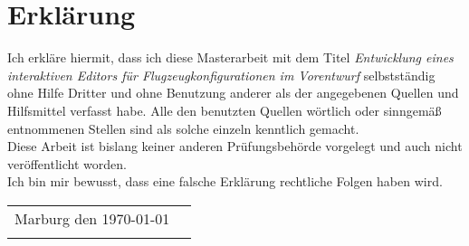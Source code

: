 \chapter*{Erkl\"arung}
\thispagestyle{empty}

\normalsize
Ich erkl\"are hiermit, dass ich diese Masterarbeit mit dem Titel \textit{Entwicklung eines interaktiven Editors f\"ur Flugzeugkonfigurationen im Vorentwurf} selbstst\"andig ohne Hilfe Dritter und ohne Benutzung anderer als der angegebenen Quellen und Hilfsmittel verfasst habe. Alle den benutzten Quellen w\"ortlich oder sinngem\"a\ss {} entnommenen Stellen sind als solche einzeln kenntlich gemacht.\\

\noindent Diese Arbeit ist bislang keiner anderen Pr\"ufungsbeh\"orde vorgelegt und auch nicht ver\"offentlicht worden.\\

\noindent Ich bin mir bewusst, dass eine falsche Erkl\"arung rechtliche Folgen haben wird.\\[3cm]

 
\vspace{5em}
 
\begin{flushright}
\begin{table}[ht]
\begin{tabularx}{\textwidth}{Xp{7cm}}
Marburg den \today & \tabularnewline \cline{2-2}  \addlinespace
 & \centering{Ren\'{e} Frank}
\end{tabularx}
\end{table}
\end{flushright}
